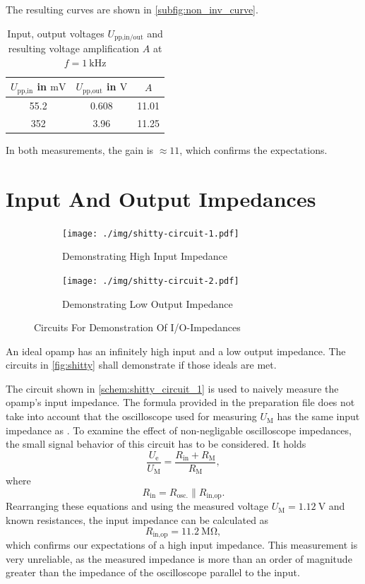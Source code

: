 The resulting curves are shown in \autoref{subfig:non_inv_curve}.
\begin{table}[tbp]
	\centering
	\caption{Input, output voltages $U_\text{pp,in/out}$ and resulting voltage amplification $A$ at $f=\SI{1}{\kilo\hertz}$}
	\label{tab:non_inv_vals}
	\begin{tabular}{SSS}
		\toprule
		{$U_\text{pp,in}$ in $\si{\milli\volt}$}&	{$U_\text{pp,out}$ in $\si{\volt}$}&	{$A$}\\
		\midrule
		\num{55.2}	&	\num{0.608}	&	\num{11.01}\\
		\num{352}	&	\num{3.96}	&	\num{11.25}\\
		\bottomrule
	\end{tabular}
\end{table}
In both measurements, the gain is $\approx 11$, which confirms the expectations.

\section{Input And Output Impedances}
\begin{figure}[tbp]
	\centering
	\begin{subfigure}{0.4\textwidth}
		\centering
		\texttt{[image: ./img/shitty-circuit-1.pdf]}
		\caption{Demonstrating High Input Impedance}
		\label{schem:shitty_circuit_1}
	\end{subfigure}
	\begin{subfigure}{0.4\textwidth}
		\centering
		\texttt{[image: ./img/shitty-circuit-2.pdf]}
		\caption{Demonstrating Low Output Impedance}
		\label{schem:shitty_circuit_2}
	\end{subfigure}
	\caption{Circuits For Demonstration Of I/O-Impedances}
	\label{fig:shitty}
\end{figure}
An ideal opamp has an infinitely high input and a low output impedance.
The circuits in \autoref{fig:shitty} shall demonstrate if those ideals are met.

The circuit shown in \autoref{schem:shitty_circuit_1} is used to naively measure the opamp's input impedance.
The formula provided in the preparation file does not take into account that the oscilloscope used for measuring $U_\text{M}$ has the same input impedance as .
To examine the effect of non-negligable oscilloscope impedances, the small signal behavior of this circuit has to be considered.
It holds
\begin{equation*}
	\frac{U_\text{e}}{U_\text{M}}=\frac{R_\text{in}+R_\text{M}}{R_\text{M}},
\end{equation*}
where
\begin{equation*}
	R_\text{in}=R_\text{osc.}\| R_\text{in,op}.
\end{equation*}
Rearranging these equations and using the measured voltage $U_\text{M}=\SI{1.12}{\volt}$ and known resistances, the input impedance can be calculated as
\begin{equation*}
	R_\text{in,op}=\SI{11.2}{\mega\ohm},
\end{equation*}
which confirms our expectations of a high input impedance.
This measurement is very unreliable, as the measured impedance is more than an order of magnitude greater than the impedance of the oscilloscope parallel to the input.

